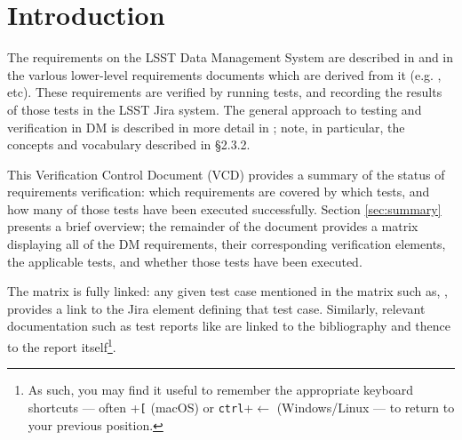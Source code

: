 
\section{Introduction}
\label{sec:intro}

The requirements on the LSST Data Management System are described in  and in the varlous lower-level requirements documents which are derived from it (e.g. , etc).
These requirements are verified by running tests, and recording the results of those tests in the LSST Jira system.
The general approach to testing and verification in DM is described in more detail in ; note, in particular, the concepts and vocabulary described in  \S2.3.2.

This Verification Control Document (VCD) provides a summary of the status of requirements verification: which requirements are covered by which tests, and how many of those tests have been executed successfully.
Section \ref{sec:summary} presents a brief overview; the remainder of the document provides a matrix displaying all of the DM requirements, their corresponding verification elements, the applicable tests, and whether those tests have been executed.

The matrix is fully linked: any given test case mentioned in the matrix such as, , provides a link to the Jira element defining that test case.
Similarly, relevant documentation such as test reports like  are linked to the bibliography and thence to the report itself\footnote{As such, you may find it useful to remember the appropriate keyboard shortcuts --- often \cmdkey{}+\texttt{[} (macOS) or \texttt{ctrl}+{$\leftarrow$ (Windows/Linux} --- to return to your previous position.}.

